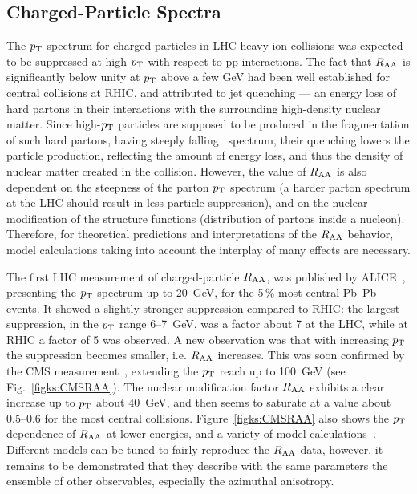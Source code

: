 \subsection{Charged-Particle Spectra}
\label{subsecks:transspectra}
The $p_{\rm T}$ spectrum for charged particles in LHC heavy-ion collisions was expected to be suppressed at high $p_{\rm T}$ with respect to pp interactions. The fact that $R_{\rm AA}$ is significantly below unity at $p_{\rm T}$ above a few GeV had been well established for central collisions at RHIC, and attributed to jet quenching --- an energy loss of hard partons in their interactions with the surrounding high-density nuclear matter. Since high-$p_{\rm T}$ particles are supposed to be produced in the fragmentation of such hard partons, having steeply falling \pt\ spectrum, their quenching lowers the particle production, reflecting the amount of energy loss, and thus the density of nuclear matter created in the collision. However, the value of $R_{\rm AA}$ is also dependent on the steepness of the parton $p_{\rm T}$ spectrum (a harder parton spectrum at the LHC should result in less particle suppression), and on the nuclear modification of the structure functions (distribution of partons inside a nucleon). Therefore, for theoretical predictions and interpretations of the $R_{\rm AA}$ behavior, model calculations taking into account the interplay of many effects are necessary.

The first LHC measurement of charged-particle $R_{\rm AA}$, was published by ALICE~\cite{Aamodt:2010jd}, presenting the $p_{\rm T}$ spectrum up to 20~GeV, for the 5\,\% most central Pb--Pb events. It showed a slightly stronger suppression compared to RHIC: the largest suppression, in the $p_{\rm T}$ range 6--7~GeV, was a factor about 7 at the LHC, while at RHIC a factor of 5 was observed. A new observation was that with increasing $p_{\rm T}$ the suppression becomes smaller, i.e. $R_{\rm AA}$ increases. This was soon confirmed by the CMS measurement~\cite{CMS:2012aa}, extending the $p_{\rm T}$ reach up to 100~GeV (see Fig.~\ref{figks:CMSRAA}). The nuclear modification factor $R_{\rm AA}$ exhibits a clear increase up to $p_{\rm T}$ about 40~GeV, and then seems to saturate at a value about 0.5--0.6 for the most central collisions. Figure~\ref{figks:CMSRAA} also shows the $p_{\rm T}$ dependence of $R_{\rm AA}$ at lower energies, and a variety of model calculations~\cite{Dainese:2004te,Vitev:2002pf,Vitev:2004bh,Salgado:2003gb,Armesto:2005iq,Renk:2011gj}. Different models can be tuned to fairly reproduce the $R_{\rm AA}$ data, however, it remains to be demonstrated that they describe with the same parameters the ensemble of other observables, especially the azimuthal anisotropy.

